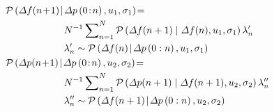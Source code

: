 \documentclass[lettersize,journal]{IEEEtran}
\newenvironment{newsubequations}{\small\begin{subequations}}{\end{subequations}}
\begin{document}
\vspace{-0.125in}
\begin{newsubequations}\label{eqn:7}
	\begin{align}
		 & \mathcal{P}\left(\varDelta f(n\!+\!1) \!\mid\! \varDelta p\left({0}\!:\! n\right), u_{1}, \sigma_{1}\right)\!= \label{eqn-7: sequential relation of adjacent frequency derivations} \\
		 & \quad\quad\qquad\qquad N^{-1}\sum\nolimits_{n=1}^{N} \mathcal{P}\left(\varDelta f(n+1) \mid \varDelta f(n), u_{1}, \sigma_{1}\right)\lambda_{n}^{\prime}\notag                      \\
		 & \quad\quad\qquad\qquad\lambda_{n}^{\prime} \sim \mathcal{P}\left(\varDelta f(n) \!\mid\!  \varDelta p\left(0: n\right), u_{1}, \sigma_{1}\right)                                    \\
		 & \mathcal{P}\left(\varDelta p(n\!+\!1) \!\mid\! \varDelta p\left({0}\!:\! n\right), u_{2}, \sigma_{2}\right) \!=\label{eqn-7: sequential relation of adjuctable outputs}             \\
		 & \quad\quad\qquad\qquad N^{-1}\sum\nolimits_{n=1}^{N} \mathcal{P}\left(\varDelta p(n+1) \mid \varDelta f(n+1), u_{2}, \sigma_{2}\right)\lambda_{n}^{\prime\prime} \notag             \\
		 & \quad\quad\qquad \qquad\lambda_{n}^{\prime\prime} \sim \mathcal{P}\left(\varDelta f(n+1) \!\mid\!  \varDelta p\left(0: n\right), u_{2}, \sigma_{2}\right)
	\end{align}
\end{newsubequations}
\end{document}
